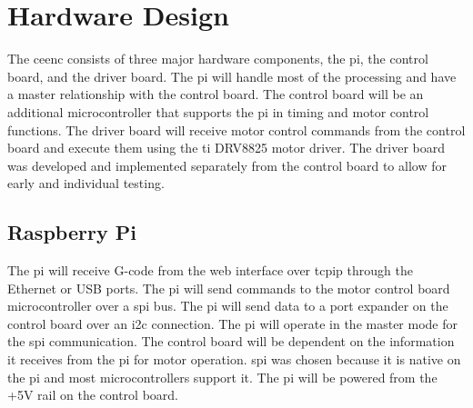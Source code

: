 \section{Hardware Design}
The \gls{ceenc} consists of three major hardware components, the \gls{pi}, the control board, and the driver board.
The \gls{pi} will handle most of the processing and have a master relationship with the control board.
The control board will be an additional microcontroller that supports the \gls{pi} in timing and motor control functions.
The driver board will receive motor control commands from the control board and execute them using the \gls{ti} DRV8825 motor driver.
The driver board was developed and implemented separately from the control board to allow for early and individual testing.

\subsection{Raspberry Pi}
The \gls{pi} will receive G-code from the web interface over \gls{tcpip} through the Ethernet or USB ports.
The \gls{pi} will send commands to the motor control board microcontroller over a \gls{spi} bus.
The \gls{pi} will send data to a port expander on the control board over an \gls{i2c} connection.
The \gls{pi} will operate in the master mode for the \gls{spi} communication.
The control board will be dependent on the information it receives from the \gls{pi} for motor operation.
\gls{spi} was chosen because it is native on the \gls{pi} and most microcontrollers support it.
The \gls{pi} will be powered from the +5V rail on the control board.

